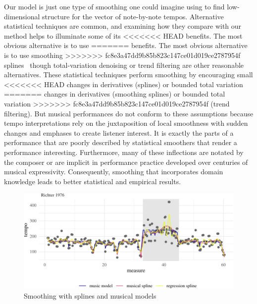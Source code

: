 \documentclass[aoas]{imsart}
\begin{document}
Our model is just one type of smoothing one could imagine using to
find low-dimensional structure for the vector of note-by-note
tempos. Alternative statistical techniques are common, and examining
how they compare with our method helps to illuminate some of its
<<<<<<< HEAD
benefits. The most obvious alternative is to use 
=======
benefits. The most obvious alternative is to use smoothing
>>>>>>> fc8e3a47dd9b85b823c147ce01d019ce2787954f
splines~\citep{CravenWahba1978,Wahba1990} though total-variation
denoising or trend filtering \citep{KimKoh2009,Tibshirani2014} are
other reasonable alternatives.
These statistical techniques perform smoothing by encouraging small
<<<<<<< HEAD
changes in derivatives (splines) or bounded total variation
=======
changes in derivatives (smoothing splines) or bounded total variation
>>>>>>> fc8e3a47dd9b85b823c147ce01d019ce2787954f
(trend filtering). 
But musical performances do not conform to these assumptions because tempo interpretations rely on the juxtaposition of local smoothness
with sudden changes and emphases to create listener interest. It is
exactly the parts of a performance that are poorly described by
statistical smoothers that render a performance
interesting. Furthermore, many of these
inflections are notated by the 
composer or are implicit in performance practice developed over
centuries of musical expressivity. Consequently, smoothing that
incorporates domain knowledge leads to better statistical and
empirical results.
\begin{figure}[t]
  \centering
  \includegraphics[width=.9\linewidth]{alternative-smoothers-1}
  \caption{Smoothing with splines and musical models}
  \label{fig:splines}
\end{figure}
\end{document}
